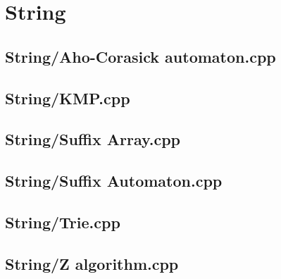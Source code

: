 \documentclass[a4paper,10pt,onecolumn,oneside]{article}
\begin{document}
\section{String}
\subsection{String/Aho-Corasick automaton.cpp}

\subsection{String/KMP.cpp}

\subsection{String/Suffix Array.cpp}

\subsection{String/Suffix Automaton.cpp}

\subsection{String/Trie.cpp}

\subsection{String/Z algorithm.cpp}


\clearpage
\end{document}
